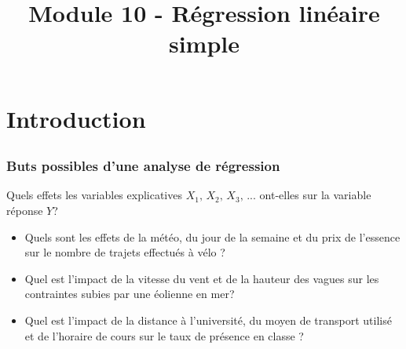 \documentclass{BeamerTemplate}
\title{Module 10 - Régression linéaire simple}
\begin{document}
\begin{frame}[t]
  \titlepage
\end{frame}







\section[Intro]{Introduction}

\subsection*{ }

\begin{frame}[t]
 \frametitle{Buts possibles d'une analyse de régression}

{\small

\alert{Quels effets les variables explicatives $X_1,\, X_2,\, X_3,\,... $ ont-elles sur la variable réponse $Y$?}

\begin{itemize}\itemsep2mm
\item Quels sont les effets de la météo, du jour de la semaine et du prix de l’essence sur le nombre de trajets effectués à vélo ?
\item Quel est l’impact de la vitesse du vent et de la hauteur des vagues sur les contraintes subies par une éolienne en mer?
\item Quel est l’impact de la distance à l’université, du moyen de transport utilisé et de l’horaire de cours sur le taux de présence en classe ?
\end{itemize}
}
\end{frame}
\end{document}
